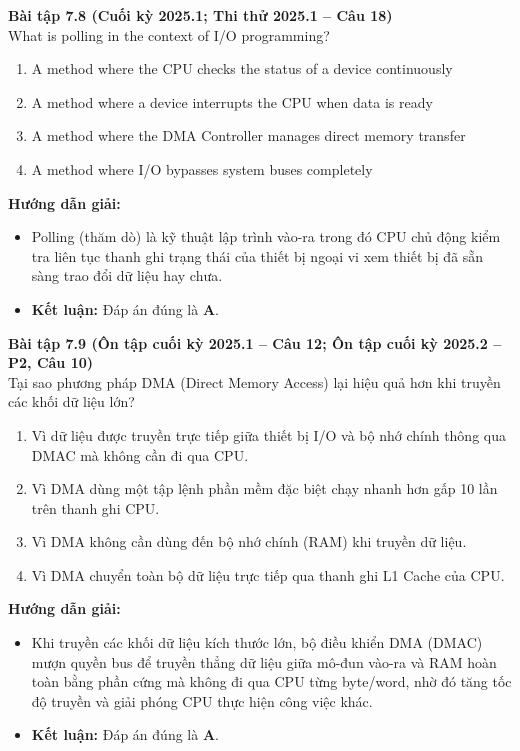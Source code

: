 \textbf{Bài tập 7.8 (Cuối kỳ 2025.1; Thi thử 2025.1 -- Câu 18)}\\
What is polling in the context of I/O programming?
\begin{enumerate}[label=\Alph*.]
    \item A method where the CPU checks the status of a device continuously
    \item A method where a device interrupts the CPU when data is ready
    \item A method where the DMA Controller manages direct memory transfer
    \item A method where I/O bypasses system buses completely
\end{enumerate}
\textbf{Hướng dẫn giải:}
\begin{itemize}
    \item Polling (thăm dò) là kỹ thuật lập trình vào-ra trong đó CPU chủ động kiểm tra liên tục thanh ghi trạng thái của thiết bị ngoại vi xem thiết bị đã sẵn sàng trao đổi dữ liệu hay chưa.
    \item \textbf{Kết luận:} Đáp án đúng là \textbf{A}.
\end{itemize}

\textbf{Bài tập 7.9 (Ôn tập cuối kỳ 2025.1 -- Câu 12; Ôn tập cuối kỳ 2025.2 -- P2, Câu 10)}\\
Tại sao phương pháp DMA (Direct Memory Access) lại hiệu quả hơn khi truyền các khối dữ liệu lớn?
\begin{enumerate}[label=\Alph*.]
    \item Vì dữ liệu được truyền trực tiếp giữa thiết bị I/O và bộ nhớ chính thông qua DMAC mà không cần đi qua CPU.
    \item Vì DMA dùng một tập lệnh phần mềm đặc biệt chạy nhanh hơn gấp 10 lần trên thanh ghi CPU.
    \item Vì DMA không cần dùng đến bộ nhớ chính (RAM) khi truyền dữ liệu.
    \item Vì DMA chuyển toàn bộ dữ liệu trực tiếp qua thanh ghi L1 Cache của CPU.
\end{enumerate}
\textbf{Hướng dẫn giải:}
\begin{itemize}
    \item Khi truyền các khối dữ liệu kích thước lớn, bộ điều khiển DMA (DMAC) mượn quyền bus để truyền thẳng dữ liệu giữa mô-đun vào-ra và RAM hoàn toàn bằng phần cứng mà không đi qua CPU từng byte/word, nhờ đó tăng tốc độ truyền và giải phóng CPU thực hiện công việc khác.
    \item \textbf{Kết luận:} Đáp án đúng là \textbf{A}.
\end{itemize}

